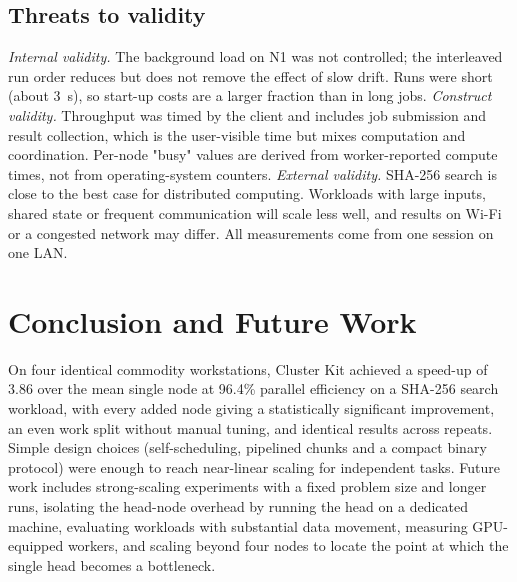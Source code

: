 \documentclass[conference,10pt]{IEEEtran}
\begin{document}
\subsection{Threats to validity}
\emph{Internal validity.} The background load on N1 was not controlled; the interleaved run order reduces but does not remove the effect of slow drift. Runs were short (about \SI{3}{s}), so start-up costs are a larger fraction than in long jobs. \emph{Construct validity.} Throughput was timed by the client and includes job submission and result collection, which is the user-visible time but mixes computation and coordination. Per-node "busy" values are derived from worker-reported compute times, not from operating-system counters. \emph{External validity.} SHA-256 search is close to the best case for distributed computing. Workloads with large inputs, shared state or frequent communication will scale less well, and results on Wi-Fi or a congested network may differ. All measurements come from one session on one LAN.

\section{Conclusion and Future Work}
On four identical commodity workstations, Cluster Kit achieved a speed-up of 3.86 over the mean single node at 96.4\% parallel efficiency on a SHA-256 search workload, with every added node giving a statistically significant improvement, an even work split without manual tuning, and identical results across repeats. Simple design choices (self-scheduling, pipelined chunks and a compact binary protocol) were enough to reach near-linear scaling for independent tasks. Future work includes strong-scaling experiments with a fixed problem size and longer runs, isolating the head-node overhead by running the head on a dedicated machine, evaluating workloads with substantial data movement, measuring GPU-equipped workers, and scaling beyond four nodes to locate the point at which the single head becomes a bottleneck.
\end{document}
